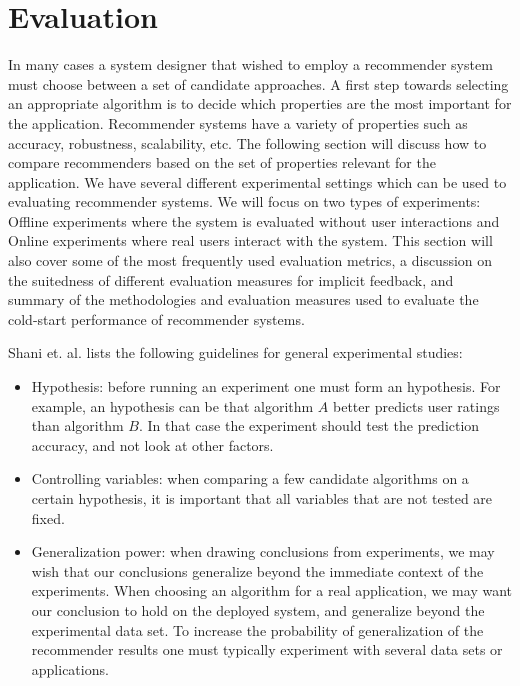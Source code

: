 
\section{Evaluation}





In many cases a system designer that wished to employ a recommender system must choose between a set of candidate approaches. A first step towards selecting an appropriate algorithm is to decide which properties are the most important for the application. Recommender systems have a variety of properties such as accuracy, robustness, scalability, etc. The following section will discuss how to compare recommenders based on the set of properties  relevant for the application. We have several different experimental settings which can be used to evaluating recommender systems. We will focus on two types of experiments: Offline experiments where the system is evaluated without user interactions and Online experiments where real users interact with the system. This section will also cover some of the most frequently used evaluation metrics, a discussion on the suitedness of different evaluation measures for implicit feedback, and summary of the methodologies and evaluation measures used to evaluate the cold-start performance of recommender systems.

Shani et. al. lists the following guidelines for general experimental studies:

\begin{itemize}
\item Hypothesis: before running an experiment one must form an hypothesis. For example, an hypothesis can be that algorithm $A$ better predicts user ratings than algorithm $B$. In that case the experiment should test the prediction accuracy, and not look at other factors.
\item Controlling variables: when comparing a few candidate algorithms on a certain hypothesis, it is important that all variables that are not tested are fixed.
\item Generalization power: when drawing conclusions from experiments, we may wish that our conclusions generalize beyond the immediate context of the experiments. When choosing an algorithm for a real application, we may want our conclusion to hold on the deployed system, and generalize beyond the experimental data set. To increase the probability of generalization of the recommender results one must typically experiment with several data sets or applications.
\end{itemize}


